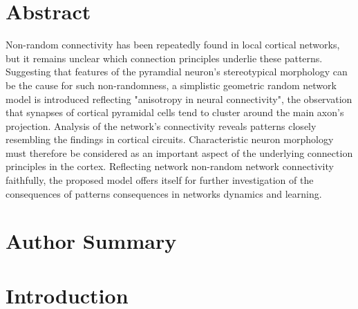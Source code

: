 \section*{Abstract}
%
Non-random connectivity has been repeatedly found in local cortical
networks, but it remains unclear which connection principles underlie
these patterns. Suggesting that features of the pyramdial neuron's
stereotypical morphology can be the cause for such non-randomness, a
simplistic geometric random network model is introduced reflecting
"anisotropy in neural connectivity", the observation that synapses of
cortical pyramidal cells tend to cluster around the main axon's
projection. Analysis of the network's connectivity reveals patterns
closely resembling the findings in cortical circuits. Characteristic
neuron morphology must therefore be considered as an important aspect
of the underlying connection principles in the cortex. Reflecting
network non-random network connectivity faithfully, the proposed model
offers itself for further investigation of the consequences of
patterns consequences in networks dynamics and learning.



\section*{Author Summary}


\section*{Introduction}


